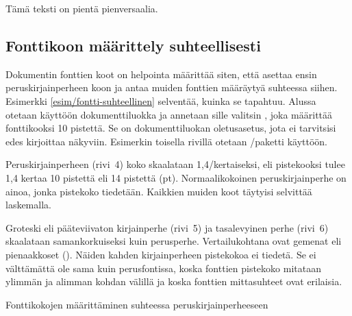 \begin{tulossis}
  \begin{footnotesize}
    \begin{scshape}
      Tämä teksti on pientä pienversaalia.
    \end{scshape}
  \end{footnotesize}
\end{tulossis}

\subsection{Fonttikoon määrittely suhteellisesti}
\label{luku/fontti-suhteellinen}

Dokumentin fonttien koot on helpointa määrittää siten, että asettaa
ensin peruskirjainperheen koon ja antaa muiden fonttien määräytyä
suhteessa siihen. Esimerkki \ref{esim/fontti-suhteellinen} selventää,
kuinka se tapahtuu. Alussa otetaan käyttöön dokumenttiluokka
 ja annetaan sille valitsin \koodi{10pt}, joka määrittää
fonttikooksi 10 pistettä. Se on dokumenttiluokan oletusasetus, jota ei
tarvitsisi edes kirjoittaa näkyviin. Esimerkin toisella rivillä otetaan
\-/paketti käyttöön.

Peruskirjainperheen (rivi~4) koko skaalataan 1,4\-/kertaiseksi, eli
pistekooksi tulee 1,4 kertaa 10 pistettä eli 14 pistettä (pt).
Normaalikokoinen peruskirjainperhe on ainoa, jonka pistekoko tiedetään.
Kaikkien muiden koot täytyisi selvittää laskemalla.

Groteski eli pääteviivaton kirjainperhe (rivi~5) ja tasalevyinen perhe
(rivi~6) skaalataan samankorkuiseksi kuin perusperhe. Vertailukohtana
ovat gemenat eli pienaakkoset (). Näiden kahden
kirjainperheen pistekokoa ei tiedetä. Se ei välttämättä ole sama kuin
perusfontissa, koska fonttien pistekoko mitataan ylimmän ja alimman
kohdan välillä ja koska fonttien mittasuhteet ovat erilaisia.

\begin{esimerkki*}

  \caption{Fonttikokojen määrittäminen suhteessa peruskirjainperheeseen}
  \label{esim/fontti-suhteellinen}
\end{esimerkki*}

